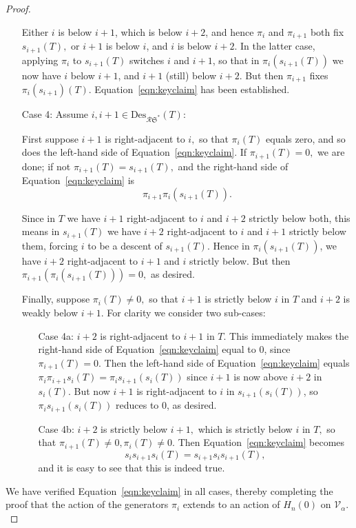 \documentclass[12pt,letterpaper]{amsart}
\theoremstyle{definition}
\begin{document}
\begin{proof}
\begin{enumerate}
 Either $i$ is below $i+1$, which is below $i+2$, and hence 
$\pi_i$ and $\pi_{i+1}$ both fix $s_{i+1}(T),$
or $i+1$ is below $i$, and $i$ is below $i+2$.  In the latter case, applying $\pi_i$ to $s_{i+1}(T)$ switches $i$ and $i+1$, so that in $\pi_i(s_{i+1}(T))$ we now have $i$ below $i+1$, and $i+1$ (still) below $i+2$.  But then $\pi_{i+1}$ fixes $\pi_i(s_{i+1})(T)$.  Equation~\eqref{eqn:keyclaim} has been established.

\item[Case 4:] Assume $i, i+1\in \mathrm{Des}_{\mathcal{R}\mathfrak{S^*}}(T)$:

First suppose $i+1$ is right-adjacent to $i,$ so that $\pi_i(T)$ equals zero, and so  does the left-hand side of 
Equation~\eqref{eqn:keyclaim}.  If $\pi_{i+1}(T) =0,$ we are done; if not $\pi_{i+1}(T)=s_{i+1}(T),$ and the right-hand side of Equation~\eqref{eqn:keyclaim} is 
\[\pi_{i+1}\pi_i (s_{i+1}(T)).\]

Since in $T$ we have $i+1$ right-adjacent to $i$ and $i+2$ strictly below both, this means in $s_{i+1}(T)$ we have $i+2$ right-adjacent to $i$ and $i+1$ strictly below them, forcing $i$ to be a descent of $s_{i+1}(T).$ Hence in $\pi_i (s_{i+1}(T)) $, we have $i+2$ right-adjacent to $i+1$ 
and $i$ strictly below.  But then $\pi_{i+1} (  \pi_i (s_{i+1}(T)) ) =0, $ as desired.

Finally, suppose $\pi_i(T)\ne 0,$ so that $i+1$ is strictly below $i$  in $T$ and $i+2$ is weakly below $i+1.$ For clarity we consider two sub-cases:
\begin{enumerate}
\item[Case 4a:] $i+2$ is right-adjacent to $i+1$ in $T$. This immediately makes the right-hand side of Equation~\eqref{eqn:keyclaim} equal to 0, since $\pi_{i+1}(T)=0.$ 
 Then the left-hand side of 
 Equation~\eqref{eqn:keyclaim} equals $\pi_i\pi_{i+1} s_i(T) =\pi_i s_{i+1}(s_i(T))$ since 
$i+1$ is now above $i+2$ in $s_i(T).$   But now $i+1$ is right-adjacent to $i$ in $s_{i+1}(s_i(T))$,  so $\pi_i s_{i+1}(s_i(T))$ reduces to 0, as desired.

\item[Case 4b:]  $i+2$ is strictly below $i+1,$ which is strictly below $i$ in $T,$ so that $\pi_{i+1}(T)\ne 0, \pi_i(T)\ne 0.$ Then Equation~\eqref{eqn:keyclaim} becomes 
\begin{equation}\label{eqn:step4} s_i s_{i+1} s_i(T) = s_{i+1} s_i s_{i+1}(T), \end{equation}
and it is easy to see that this is indeed true.  
\end{enumerate}
\end{enumerate}
We have verified Equation~\eqref{eqn:keyclaim} in all cases, thereby completing the proof that the action of the generators $\pi_i$ extends to an action of $H_n(0)$ on $\mathcal{V}_\alpha.$ 
\end{proof}
\end{document}
